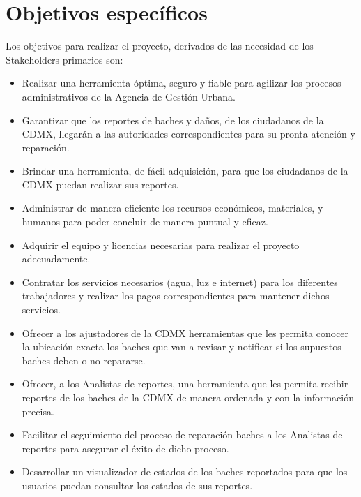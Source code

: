 \chapter{Objetivos específicos}
Los objetivos para realizar el proyecto, derivados de las necesidad de los Stakeholders primarios son:

\begin{itemize}
    \item Realizar una herramienta óptima, seguro y fiable para agilizar los procesos administrativos de la Agencia de Gestión Urbana.
    \item Garantizar que los reportes de baches y daños, de los ciudadanos de la CDMX, llegarán a las autoridades correspondientes para su pronta atención y reparación.
    \item Brindar una herramienta, de fácil adquisición, para que los ciudadanos de la CDMX puedan realizar sus reportes.
    \item Administrar de manera eficiente los recursos económicos, materiales, y humanos para poder concluir de manera puntual y eficaz.
    \item Adquirir el equipo y licencias necesarias para realizar el proyecto adecuadamente.
    \item Contratar los servicios necesarios (agua, luz e internet) para los diferentes trabajadores y realizar los pagos correspondientes para mantener dichos servicios.
    \item Ofrecer a los ajustadores de la CDMX herramientas que les permita conocer la ubicación exacta los baches que van a revisar y notificar si los supuestos baches deben o no repararse.
    \item Ofrecer, a los Analistas de reportes, una herramienta que les permita recibir reportes de los baches de la CDMX de manera ordenada y con la información precisa.
    \item Facilitar el seguimiento del proceso de reparación baches a los Analistas de reportes para asegurar el éxito de dicho proceso.
    \item Desarrollar un visualizador de estados de los baches reportados para que los usuarios puedan consultar los estados de sus reportes.
    
\end{itemize}
